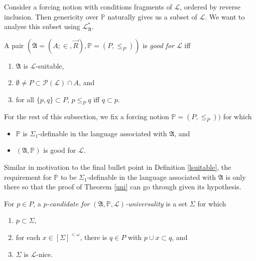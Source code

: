 \documentclass[12pt]{article}
\numberwithin{equation}{section}
\begin{document}
Consider a forcing notion with conditions fragments of $\mathcal{L}$, ordered by reverse inclusion. Then genericity over $\mathbb{P}$ naturally gives us a subset of $\mathcal{L}$. We want to analyse this subset using $\mathcal{L}^{*}_{\mathfrak{A}}$.

\begin{defi}
A pair $(\mathfrak{A} = (A; \in, \Vec{R}), \mathbb{P} = (P, \leq_P))$ is \emph{good for} $\mathcal{L}$ iff 
\begin{enumerate}[label=(\alph*)]
    \item $\mathfrak{A}$ is $\mathcal{L}$-suitable,
    \item $\emptyset \neq P \subset \mathcal{P}(\mathcal{L}) \cap A$, and
    \item for all $\{p, q\} \subset P$, $p \leq_P q$ iff $q \subset p$.
\end{enumerate}
\end{defi}

For the rest of this subsection, we fix a forcing notion $\mathbb{P} = (P, \leq_P))$ for which
\begin{itemize}
    \item $\mathbb{P}$ is $\Sigma_1$-definable in the language associated with $\mathfrak{A}$, and
    \item $(\mathfrak{A}, \mathbb{P})$ is good for $\mathcal{L}$.
\end{itemize}
Similar in motivation to the final bullet point in Definition \ref{lsuitable}, the requirement for $\mathbb{P}$ to be $\Sigma_1$-definable in the language associated with $\mathfrak{A}$ is only there so that the proof of Theorem \ref{uni} can go through given its hypothesis.

\begin{defi}
For $p \in P$, a $p$\emph{-candidate for} $(\mathfrak{A}, \mathbb{P}, \mathcal{L})$\emph{-universality} is a set $\Sigma$ for which
\begin{enumerate}[label=(\alph*)]
   \item $p \subset \Sigma$,
   \item for each $x \in [\Sigma]^{<\omega}$, there is $q \in P$ with $p \cup x \subset q$, and 
   \item $\Sigma$ is $\mathcal{L}$-nice.
\end{enumerate}
\end{defi}
\end{document}
